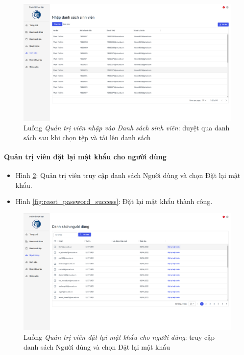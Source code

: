 \documentclass[./../main.tex]{subfiles}
\begin{document}
\begin{figure}[]
	\includegraphics[width=\linewidth]{./images/image28.png}
	\caption{Luồng \emph{Quản trị viên nhập vào Danh sách sinh viên}: duyệt qua danh sách sau khi chọn tệp và tải lên danh sách}
	\label{fig:upload_list}
\end{figure}

\paragraph*{Quản trị viên đặt lại mật khẩu cho người dùng}

\begin{itemize}
	\item Hình \ref{fig:admin_access_list_users}: Quản trị viên truy cập danh sách Người dùng và chọn Đặt lại mật khẩu.
	\item Hình \ref{fig:reset_password_success}: Đặt lại mật khẩu thành công.
\end{itemize}

\begin{figure}[]
	\includegraphics[width=\linewidth]{./images/image69.png}
	\caption{Luồng \emph{Quản trị viên đặt lại mật khẩu cho người dùng}: truy cập danh sách Người dùng và chọn Đặt lại mật khẩu}
	\label{fig:admin_access_list_users}
\end{figure}
\end{document}

